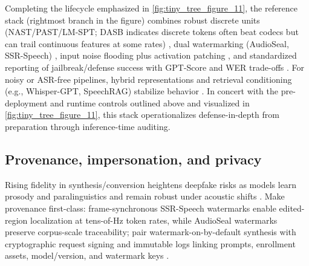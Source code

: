 \documentclass{article}
\begin{document}
Completing the lifecycle emphasized in \autoref{fig:tiny_tree_figure_11}, the reference stack (rightmost branch in the figure) combines robust discrete units (NAST/PAST/LM-SPT; DASB indicates discrete tokens often beat codecs but can trail continuous features at some rates) \cite{mousavi2024dasbdiscreteaudiospeechbenchmark,mousavi2024howshouldweextractdiscreteaudiotokenssel,onda2025benchmarkingprosodyencodingdiscretespeec,har-tuv2025pastphoneticacousticspeechtokenizer,jo2025lmsptalignedsemanticdistillationspeechto,messica2024nastnoiseawarespeechtokenizationlanguage}, dual watermarking (AudioSeal, SSR-Speech) \cite{zhao2024advancingspeechlanguagemodelsscalingsupe,wang2025ssrspeechtowardsstablesaferobustzeroshot}, input noise flooding plus activation patching \cite{peri2024speechguardexploringadversarialrobustnes,djanibekov2025spiritpatchingspeechlanguagemodelsagains}, and standardized reporting of jailbreak/defense success with GPT-Score and WER trade-offs \cite{peri2024speechguardexploringadversarialrobustnes,djanibekov2025spiritpatchingspeechlanguagemodelsagains,vashishth2024stabspeechtokenizerassessmentbenchmark}. For noisy or ASR-free pipelines, hybrid representations and retrieval conditioning (e.g., Whisper-GPT, SpeechRAG) stabilize behavior \cite{verma2024whispergpthybridrepresentationaudiolarge,min2025speechretrievalaugmentedgenerationwithou}. In concert with the pre-deployment and runtime controls outlined above and visualized in \autoref{fig:tiny_tree_figure_11}, this stack operationalizes defense-in-depth from preparation through inference-time auditing.

\subsection{Provenance, impersonation, and privacy} \label{subsec:Provenance, impersonation, and privacy}
Rising fidelity in synthesis/conversion heightens deepfake risks as models learn prosody and paralinguistics and remain robust under acoustic shifts \cite{chen2025variationalframeworkimprovingnaturalness,verma2024whispergpthybridrepresentationaudiolarge,maimon2025salmonsuiteacousticlanguagemodelevaluati,entry2025augmentationinvariantdiscreterepresentat}. Make provenance first-class: frame-synchronous SSR-Speech watermarks enable edited-region localization at tens-of-Hz token rates, while AudioSeal watermarks preserve corpus-scale traceability; pair watermark-on-by-default synthesis with cryptographic request signing and immutable logs linking prompts, enrollment assets, model/version, and watermark keys \cite{wang2025ssrspeechtowardsstablesaferobustzeroshot,zhao2024advancingspeechlanguagemodelsscalingsupe,gong2024seamlessexpressivelmspeechlanguagemodele}.
\end{document}
